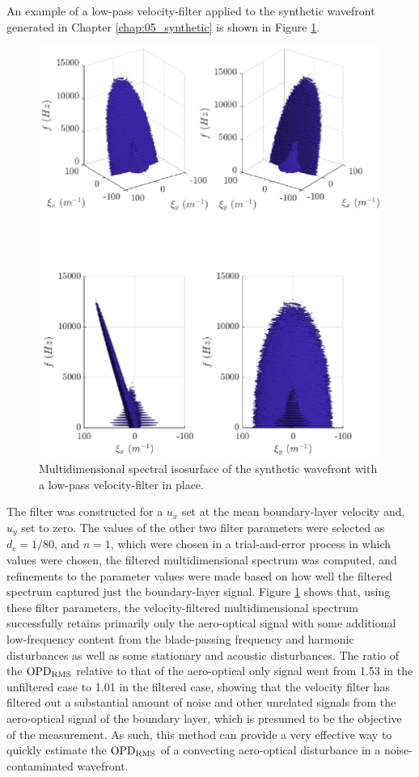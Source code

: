 An example of a low-pass velocity-filter applied to the synthetic wavefront generated in Chapter \ref{chap:05_synthetic} is shown in Figure \ref{fig:06_filter_velocity}.
\begin{figure}
 \centering
 \includegraphics{../matlab/06_single_sensor_filtering/filter_velocity.eps}
 \caption{Multidimensional spectral isosurface of the synthetic wavefront with a low-pass velocity-filter in place.}
 \label{fig:06_filter_velocity}
\end{figure}
The filter was constructed for a $u_x$ set at the mean boundary-layer velocity and, $u_y$ set to zero.
The values of the other two filter parameters were selected as $d_c=1/80$, and $n=1$, which were chosen in a trial-and-error process in which values were chosen, the filtered multidimensional spectrum was computed, and refinements to the parameter values were made based on how well the filtered spectrum captured just the boundary-layer signal.
Figure \ref{fig:06_filter_velocity} shows that, using these filter parameters, the  velocity-filtered multidimensional spectrum successfully retains primarily only the aero-optical signal with some additional low-frequency content from the blade-passing frequency and harmonic disturbances as well as some stationary and acoustic disturbances.
The ratio of the $\operatorname{OPD_{RMS}}$ relative to that of the aero-optical only signal went from 1.53 in the unfiltered case to 1.01 in the filtered case, showing that the velocity filter has filtered out a substantial amount of noise and other unrelated signals from the aero-optical signal of the boundary layer, which is presumed to be the objective of the measurement.
As such, this method can provide a very effective way to quickly estimate the $\operatorname{OPD_{RMS}}$ of a convecting aero-optical disturbance in a noise-contaminated wavefront.

